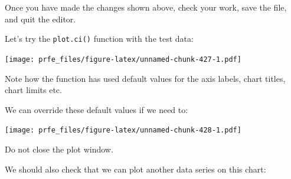 \documentclass[12pt,a4paper]{book}
\newenvironment{Shaded}{\begin{snugshade}}{\end{snugshade}}
\newcommand{\DataTypeTok}[1]{\textcolor[rgb]{0.13,0.29,0.53}{#1}}
\newcommand{\DecValTok}[1]{\textcolor[rgb]{0.00,0.00,0.81}{#1}}
\newcommand{\KeywordTok}[1]{\textcolor[rgb]{0.13,0.29,0.53}{\textbf{#1}}}
\newcommand{\NormalTok}[1]{#1}
\newcommand{\OperatorTok}[1]{\textcolor[rgb]{0.81,0.36,0.00}{\textbf{#1}}}
\newcommand{\OtherTok}[1]{\textcolor[rgb]{0.56,0.35,0.01}{#1}}
\newcommand{\StringTok}[1]{\textcolor[rgb]{0.31,0.60,0.02}{#1}}
\theoremstyle{definition}
\theoremstyle{definition}
\theoremstyle{definition}
\theoremstyle{remark}
\begin{document}
Once you have made the changes shown above, check your work, save the
file, and quit the editor.

Let's try the \texttt{plot.ci()} function with the test data:

\begin{Shaded}
\end{Shaded}

\texttt{[image: prfe\_files/figure-latex/unnamed-chunk-427-1.pdf]}

Note how the function has used default values for the axis labels, chart
titles, chart limits etc.

We can override these default values if we need to:

\begin{Shaded}
\end{Shaded}

\texttt{[image: prfe\_files/figure-latex/unnamed-chunk-428-1.pdf]}

Do not close the plot window.

We should also check that we can plot another data series on this chart:

\begin{Shaded}
\end{Shaded}
\end{document}
